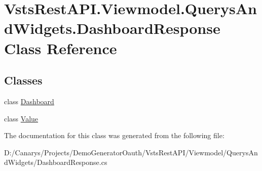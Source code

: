 \hypertarget{class_vsts_rest_a_p_i_1_1_viewmodel_1_1_querys_and_widgets_1_1_dashboard_response}{}\section{Vsts\+Rest\+A\+P\+I.\+Viewmodel.\+Querys\+And\+Widgets.\+Dashboard\+Response Class Reference}
\label{class_vsts_rest_a_p_i_1_1_viewmodel_1_1_querys_and_widgets_1_1_dashboard_response}
\subsection*{Classes}
\begin{DoxyCompactItemize}
\item 
class \mbox{\hyperlink{class_vsts_rest_a_p_i_1_1_viewmodel_1_1_querys_and_widgets_1_1_dashboard_response_1_1_dashboard}{Dashboard}}
\item 
class \mbox{\hyperlink{class_vsts_rest_a_p_i_1_1_viewmodel_1_1_querys_and_widgets_1_1_dashboard_response_1_1_value}{Value}}
\end{DoxyCompactItemize}


The documentation for this class was generated from the following file\+:\begin{DoxyCompactItemize}
\item 
D\+:/\+Canarys/\+Projects/\+Demo\+Generator\+Oauth/\+Vsts\+Rest\+A\+P\+I/\+Viewmodel/\+Querys\+And\+Widgets/Dashboard\+Response.\+cs\end{DoxyCompactItemize}
